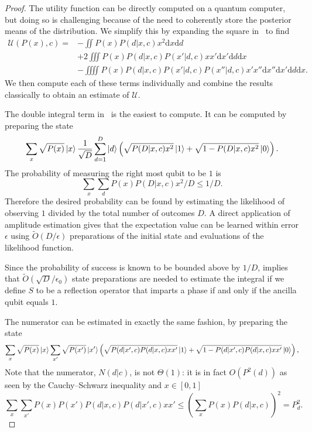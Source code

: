 \documentclass[aps,amsmath,onecolumn,amssymb]{revtex4}
\begin{document}
\begin{proof}
The utility function can be directly computed on a quantum computer, but doing
so is challenging because of the need to coherently store the posterior means
of the distribution.  We simplify this by expanding the square in~
to find
\begin{align}
\mathcal{U}(P(x),c) = &-\iint P(x) P(d|x,c) x^2 \mathrm{d}x\mathrm{d}d\nonumber\\
&+2\iiint P(x) P(d|x,c) P(x'|d,c) xx' \mathrm{d}x' \mathrm{d}d\mathrm{d}x\nonumber\\
&-\iiiint P(x) P(d|x,c) P(x'|d,c)P(x''|d,c) x'x'' \mathrm{d}x''\mathrm{d}x' \mathrm{d}d\mathrm{d}x.\label{eq:multiutility}
\end{align}
We then compute each of these terms individually and combine the results classically to obtain an estimate of $\mathcal{U}$.

The double integral term in~ is the easiest to compute.  It can be computed by preparing the state
\begin{equation}
\sum_x \sqrt{P(x)} \left|x\right\rangle \frac{1}{\sqrt{D}}\sum_{d=1}^D \left|d\right\rangle\left(\sqrt{{P(D|x,c)x^2}}\left|1\right\rangle + \sqrt{1 -P(D|x,c)x^2}\left|0\right\rangle \right). 
\end{equation}
The probability of measuring the right most qubit to be $1$ is $$\sum_x\sum_d P(x)P(D|x,c)x^2/D \le 1/D.$$  Therefore the desired probability can be found by estimating the likelihood of observing $1$ divided by the total number of outcomes $D$.  A direct application of amplitude estimation gives that the expectation value can be learned within error $\epsilon$ using $\tilde{O}(D/\epsilon)$ preparations of the initial state and evaluations of the likelihood function.  

Since the probability of success is known to be bounded above by $1/D$,  implies that $\tilde{O}(\sqrt{D}/\epsilon_0)$ state preparations are needed to estimate the integral if we define $S$ to be a reflection operator that imparts a phase if and only if the ancilla qubit equals $1$.


The numerator can be estimated in exactly the same fashion, by preparing the state
\begin{equation}
\sum_x \sqrt{P(x)} \left|x\right\rangle\sum_{x'} \sqrt{P(x')} \left|x'\right\rangle \left(\sqrt{P(d|x',c){P(d|x,c)}xx'}\left|1\right\rangle + \sqrt{1 -P(d|x',c)P(d|x,c)xx'}\left|0\right\rangle \right),
\end{equation}
Note that the numerator, $N(d|c)$, is not $\Theta(1)$: it is in fact $O(P^2(d))$ as seen by the Cauchy--Schwarz inequality and $x\in [0,1]$
\begin{equation}
\sum_x \sum_{x'} P(x) P(x') P(d|x,c) P(d|x',c) x x' \le \left(\sum_x P(x) P(d|x,c)\right)^2=P_d^2.
\end{equation}


\end{proof}
\end{document}
